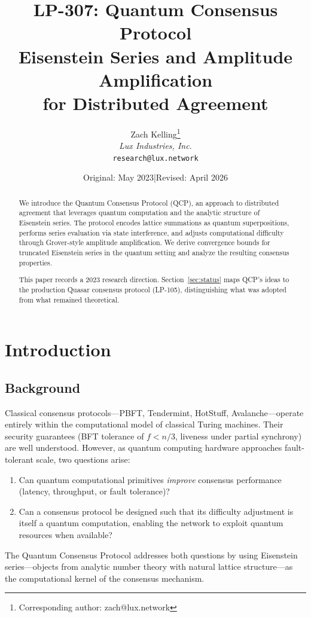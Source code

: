 \documentclass[11pt,a4paper]{article}
\title{LP-307: Quantum Consensus Protocol\\[4pt]
\large Eisenstein Series and Amplitude Amplification\\
for Distributed Agreement}
\author{
Zach Kelling\thanks{Corresponding author: zach@lux.network}\\
\textit{Lux Industries, Inc.}\\
\texttt{research@lux.network}
}
\date{Original: May 2023\quad|\quad Revised: April 2026}
\begin{document}
\luxcoverpage

\begin{abstract}
We introduce the Quantum Consensus Protocol (QCP), an approach to
distributed agreement that leverages quantum computation and the
analytic structure of Eisenstein series. The protocol encodes lattice
summations as quantum superpositions, performs series evaluation via
state interference, and adjusts computational difficulty through
Grover-style amplitude amplification. We derive convergence bounds for
truncated Eisenstein series in the quantum setting and analyze the
resulting consensus properties.

This paper records a 2023 research direction. Section~\ref{sec:status}
maps QCP's ideas to the production Quasar consensus protocol (LP-105),
distinguishing what was adopted from what remained theoretical.
\end{abstract}

\tableofcontents
\newpage

\section{Introduction}

\subsection{Background}

Classical consensus protocols---PBFT, Tendermint, HotStuff,
Avalanche---operate entirely within the computational model of
classical Turing machines. Their security guarantees (BFT tolerance
of $f < n/3$, liveness under partial synchrony) are well understood.
However, as quantum computing hardware approaches fault-tolerant
scale, two questions arise:

\begin{enumerate}[nosep]
  \item Can quantum computational primitives \emph{improve} consensus
        performance (latency, throughput, or fault tolerance)?
  \item Can a consensus protocol be designed such that its difficulty
        adjustment is itself a quantum computation, enabling the network
        to exploit quantum resources when available?
\end{enumerate}

The Quantum Consensus Protocol addresses both questions by using
Eisenstein series---objects from analytic number theory with natural
lattice structure---as the computational kernel of the consensus
mechanism.
\end{document}
